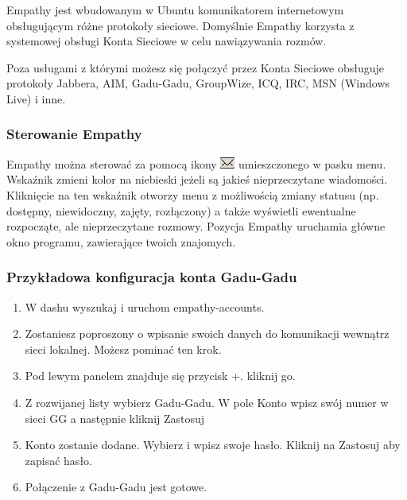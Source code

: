 \textcolor{ubuntu_orange}{Empathy} jest wbudowanym w Ubuntu komunikatorem internetowym obsługującym różne protokoły sieciowe. Domyślnie Empathy korzysta z systemowej obsługi \textcolor{ubuntu_orange}{Konta Sieciowe} w celu nawiązywania rozmów.

Poza usługami z którymi możesz się połączyć przez Konta Sieciowe obsługuje protokoły Jabbera, AIM, Gadu-Gadu, GroupWize, ICQ, IRC, MSN (Windows Live) i inne.

\subsubsection{Sterowanie Empathy}
Empathy można sterować za pomocą ikony \includegraphics{images/unity_wskaznik_wiadomosci.png} umieszczonego w pasku menu. Wskaźnik zmieni kolor na niebieski jeżeli są jakieś nieprzeczytane wiadomości. Kliknięcie na ten wskaźnik otworzy menu z możliwością zmiany statusu (np. dostępny, niewidoczny, zajęty, rozłączony) a także wyświetli ewentualne rozpocząte, ale nieprzeczytane rozmowy. Pozycja \textcolor{ubuntu_orange}{Empathy} uruchamia główne okno programu, zawierające twoich znajomych.

\subsubsection{Przykładowa konfiguracja konta Gadu-Gadu}
\begin{enumerate}
\item W dashu wyszukaj i uruchom \textcolor{ubuntu_orange}{empathy-accounts}.
\item Zostaniesz poproszony o wpisanie swoich danych do komunikacji wewnątrz sieci lokalnej. Możesz pominać ten krok.
\item Pod lewym panelem znajduje się przycisk \textcolor{ubuntu_orange}{+}. kliknij go.
\item \begin{minipage}[t]{\linewidth}
          \raggedright
          
          \medskip
          Z rozwijanej listy wybierz \textcolor{ubuntu_orange}{Gadu-Gadu}. W pole \textcolor{ubuntu_orange}{Konto} wpisz swój numer w sieci GG a następnie kliknij \textcolor{ubuntu_orange}{Zastosuj}
    \end{minipage}
\item Konto zostanie dodane. Wybierz  i wpisz swoje hasło. Kliknij na \textcolor{ubuntu_orange}{Zastosuj} aby zapisać hasło.
\item Połączenie z Gadu-Gadu jest gotowe.
\end{enumerate}